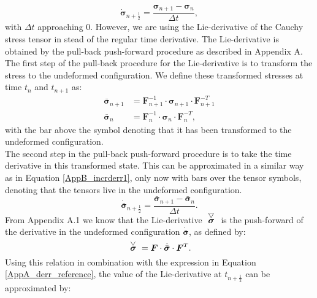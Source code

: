 {\begin{equation}\label{AppB_incrderr1}
\dot{{\boldsymbol{\sigma}}}_{n+\frac{1}{2}}=\frac{{\boldsymbol{\sigma}}_{n+1}-{\boldsymbol{\sigma}}_{n}}{\Delta t},
\end{equation}
with $\Delta t$ approaching $0$.
However, we are using the Lie-derivative of the Cauchy stress tensor in stead of the regular time derivative. The Lie-derivative is obtained by the pull-back push-forward procedure as described in Appendix A. The first step of the pull-back procedure for the Lie-derivative is to transform the stress to the undeformed configuration. We define these transformed stresses at time $t_n$ and $t_{n+1}$ as:
\begin{equation}
\left.\begin{aligned}
\bar{\boldsymbol{\sigma}}_{n+1} &=\boldsymbol{F}_{n+1}^{-1}\cdot\boldsymbol{\sigma}_{n+1}\cdot\boldsymbol{F}_{n+1}^{-T}\\
\bar{\boldsymbol{\sigma}}_{n} &= \boldsymbol{F}^{-1}_{n}\cdot\boldsymbol{\sigma}_{n}\cdot\boldsymbol{F}_{n}^{-T},
\end{aligned}\right.
\label{Ch3_stressbar}
\end{equation}
with the bar above the symbol denoting that it has been transformed to the undeformed configuration.\\
\newline
The second step in the pull-back push-forward procedure is to take the time derivative in this transformed state. This can be approximated in a similar way as in Equation \ref{AppB_incrderr1}, only now with bars over the tensor symbols, denoting that the tensors live in the undeformed configuration.
{\begin{equation}\label{AppA_derr_reference}
\dot{\bar{\boldsymbol{\sigma}}}_{n+\frac{1}{2}}=\frac{\bar{\boldsymbol{\sigma}}_{n+1}-\bar{\boldsymbol{\sigma}}_{n}}{\Delta t}.
\end{equation}
From Appendix A.1 we know that the Lie-derivative $\acctriang{\boldsymbol{\sigma}}$ is the push-forward of the derivative in the undeformed configuration $\dot{\bar{\boldsymbol{\sigma}}}$, as defined by:
\begin{equation}
\acctriang{\boldsymbol{\sigma}} =  \boldsymbol{F}\cdot\dot{\bar{\boldsymbol{\sigma}}}\cdot\boldsymbol{F}^{T}.
\end{equation}
Using this relation in combination with the expression in Equation \ref{AppA_derr_reference}, the value of the Lie-derivative at $t_{n+\frac{1}{2}}$ can be approximated by:
\begin{equation}

\end{equation}}}
